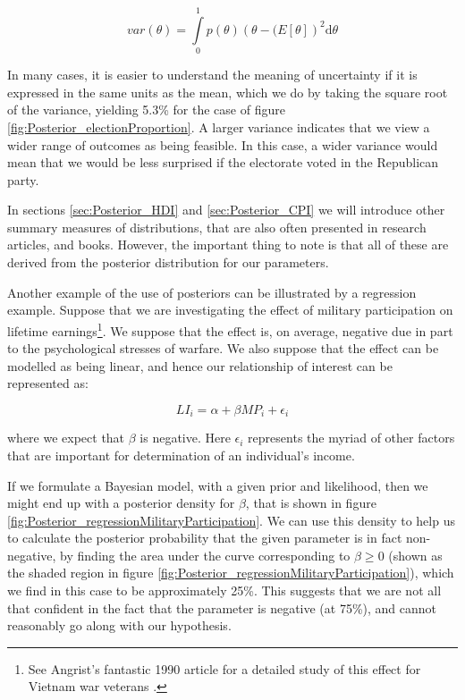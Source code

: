 \documentclass[11pt,fullpage]{book}
\begin{document}
\begin{equation}
var(\theta)=  \int\limits_{0}^{1} p(\theta)(\theta-\mathbb(E[\theta])^2 \mathrm{d}\theta
\end{equation}

In many cases, it is easier to understand the meaning of uncertainty if it is expressed in the same units as the mean, which we do by taking the square root of the variance, yielding 5.3\% for the case of figure \ref{fig:Posterior_electionProportion}. A larger variance indicates that we view a wider range of outcomes as being feasible. In this case, a wider variance would mean that we would be less surprised if the electorate voted in the Republican party. 

In sections \ref{sec:Posterior_HDI} and \ref{sec:Posterior_CPI} we will introduce other summary measures of distributions, that are also often presented in research articles, and books. However, the important thing to note is that all of these are derived from the posterior distribution for our parameters. 

Another example of the use of posteriors can be illustrated by a regression example. Suppose that we are investigating the effect of military participation on lifetime earnings\footnote{See Angrist's fantastic 1990 article for a detailed study of this effect for Vietnam war veterans \cite{angrist1990lifetime}.}. We suppose that the effect is, on average, negative due in part to the psychological stresses of warfare. We also suppose that the effect can be modelled as being linear, and hence our relationship of interest can be represented as:

\begin{equation}\label{eq:Posterior_militaryParticipation}
LI_i = \alpha + \beta MP_i + \epsilon_i
\end{equation}

where we expect that $\beta$ is negative. Here $\epsilon_i$ represents the myriad of other factors that are important for determination of an individual's income.

If we formulate a Bayesian model, with a given prior and likelihood, then we might end up with a posterior density for $\beta$, that is shown in figure \ref{fig:Posterior_regressionMilitaryParticipation}. We can use this density to help us to calculate the posterior probability that the given parameter is in fact non-negative, by finding the area under the curve corresponding to $\beta\geq 0$ (shown as the shaded region in figure \ref{fig:Posterior_regressionMilitaryParticipation}), which we find in this case to be approximately 25\%. This suggests that we are not all that confident in the fact that the parameter is negative (at 75\%), and cannot reasonably go along with our hypothesis.
\end{document}
